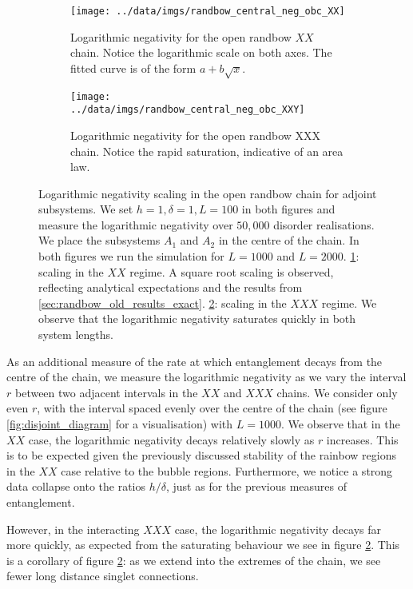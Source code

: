 \begin{figure}
     \centering
     \begin{subfigure}[b]{0.8\textwidth}
   \centering
     \texttt{[image: ../data/imgs/randbow\_central\_neg\_obc\_XX]}
    \caption{Logarithmic negativity for the open randbow $XX$ chain. Notice the logarithmic scale on both axes. The fitted curve is of the form $a + b\sqrt{x}$.}
    \label{fig:randbow_central_neg_XX}
    \end{subfigure}%
     \hfill
     \begin{subfigure}[b]{0.8\textwidth}
         \centering
    \texttt{[image: ../data/imgs/randbow\_central\_neg\_obc\_XXY]}
    \caption{Logarithmic negativity for the open randbow XXX chain. Notice the rapid saturation, indicative of an area law.}
    \label{fig:randbow_central_neg_XXX}
         \end{subfigure}
            \caption{Logarithmic negativity scaling in the open randbow chain for adjoint subsystems. We set $h = 1, \delta = 1, L = 100$ in both figures and measure the logarithmic negativity over $50,000$ disorder realisations. We place the subsystems $A_1$ and $A_2$ in the centre of the chain. In both figures we run the simulation for $L = 1000$ and $L = 2000$. \ref{fig:randbow_central_neg_XX}: scaling in the $XX$ regime. A square root scaling is observed, reflecting analytical expectations and the results from \ref{sec:randbow_old_results_exact}. \ref{fig:randbow_central_neg_XXX}: scaling in the $XXX$ regime. We observe that the logarithmic negativity saturates quickly in both system lengths.}
        \label{fig:randbow_negativity_scaling}
\end{figure}

As an additional measure of the rate at which entanglement decays from the centre of the chain, we measure the logarithmic negativity as we vary the interval $r$ between two adjacent intervals in the $XX$ and $XXX$ chains. We consider only even $r$, with the interval spaced evenly over the centre of the chain (see figure \ref{fig:disjoint_diagram} for a visualisation) with $L = 1000$. We observe that in the $XX$ case, the logarithmic negativity decays relatively slowly as $r$ increases. This is to be expected given the previously discussed stability of the rainbow regions in the $XX$ case relative to the bubble regions. Furthermore, we notice a strong data collapse onto the ratios $h / \delta$, just as for the previous measures of entanglement. 

However, in the interacting $XXX$ case, the logarithmic negativity decays far more quickly, as expected from the saturating behaviour we see in figure \ref{fig:randbow_central_neg_XXX}. This is a corollary of figure \ref{fig:randbow_central_neg_XXX}: as we extend into the extremes of the chain, we see fewer long distance singlet connections.

